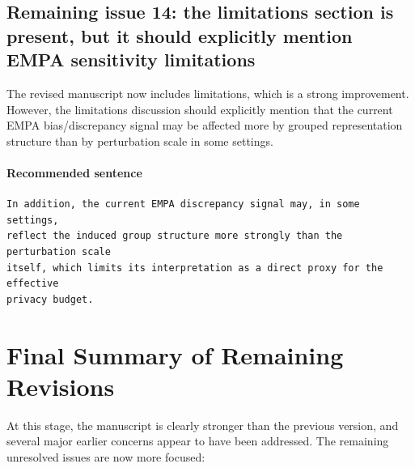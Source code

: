 \documentclass[11pt]{article}
\begin{document}
\subsection*{Remaining issue 14: the limitations section is present, but it should explicitly mention EMPA sensitivity limitations}
The revised manuscript now includes limitations, which is a strong improvement. However, the limitations discussion should explicitly mention that the current EMPA bias/discrepancy signal may be affected more by grouped representation structure than by perturbation scale in some settings.

\paragraph{Recommended sentence}
\begin{verbatim}
In addition, the current EMPA discrepancy signal may, in some settings,
reflect the induced group structure more strongly than the perturbation scale
itself, which limits its interpretation as a direct proxy for the effective
privacy budget.
\end{verbatim}

\section*{Final Summary of Remaining Revisions}
At this stage, the manuscript is clearly stronger than the previous version, and several major earlier concerns appear to have been addressed. The remaining unresolved issues are now more focused:
\end{document}
